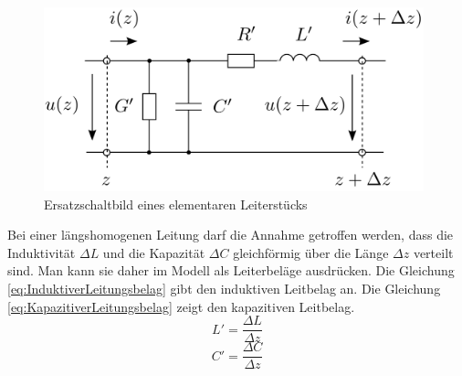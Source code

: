 \begin{figure}[!htb]
	\centering
	\includegraphics[width=11cm]{content/bilder/Leiterstueck.pdf}%
	\caption{Ersatzschaltbild eines elementaren Leiterstücks}
	\label{fig:ESBLeiterstueck}
\end{figure}

Bei einer längshomogenen Leitung darf die Annahme getroffen werden, dass die Induktivität $\Delta L$ und die Kapazität $\Delta C$ gleichförmig über die Länge $\Delta z$ verteilt sind. Man kann sie daher im Modell als Leiterbeläge ausdrücken. Die Gleichung \ref{eq:InduktiverLeitungsbelag} gibt den induktiven Leitbelag an. Die Gleichung \ref{eq:KapazitiverLeitungsbelag} zeigt den kapazitiven Leitbelag.
\begin{equation}
L'=\dfrac{\Delta L}{\Delta z}\label{eq:InduktiverLeitungsbelag}
\end{equation}
\begin{equation}
C'=\dfrac{\Delta C}{\Delta z}\label{eq:KapazitiverLeitungsbelag}
\end{equation}


